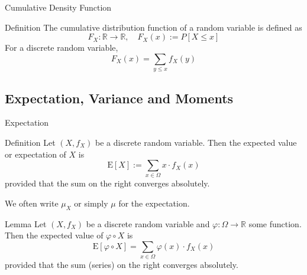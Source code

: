 \documentclass{beamer}
\begin{document}
\begin{frame}{Cumulative Density Function}
\begin{block}{Definition}
The cumulative distribution function of a random variable is defined as
$$
F_{X}: \mathbb{R} \rightarrow \mathbb{R}, \quad F_{X}(x):=P[X \leq x]
$$
For a discrete random variable,
$$
F_{X}(x)=\sum_{y \leq x} f_{X}(y)
$$
\end{block}

\end{frame}

\subsection{Expectation, Variance and Moments}
\begin{frame}{Expectation}
\begin{block}{Definition}
Let $\left(X, f_{X}\right)$ be a discrete random variable. Then the expected value or expectation of $X$ is
$$
\mathrm{E}[X]:=\sum_{x \in \Omega} x \cdot f_{X}(x)
$$
provided that the sum on the right converges absolutely.
\end{block}
We often write $\mu_{X}$ or simply $\mu$ for the expectation.
\begin{block}{Lemma}
Let $\left(X, f_{X}\right)$ be a discrete random variable and $\varphi: \Omega \rightarrow \mathbb{R}$ some function. Then the expected value of $\varphi \circ X$ is
$$
\mathrm{E}[\varphi \circ X]=\sum_{x \in \Omega} \varphi(x) \cdot f_{X}(x)
$$
provided that the sum (series) on the right converges absolutely.
\end{block}
\end{frame}
\end{document}
